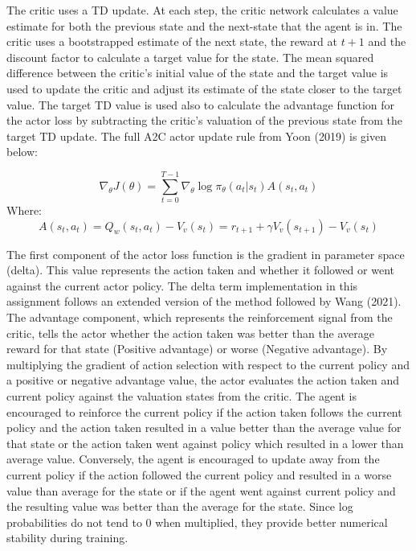 \documentclass{article}
\begin{document}
The critic uses a TD update. At each step, the critic network calculates a value estimate for both the previous state and the next-state that the agent is in. The critic uses a bootstrapped estimate of the next state, the reward at $t+1$ and the discount factor to calculate a target value for the state. The mean squared difference between the critic's initial value of the state and the target value is used to update the critic and adjust its estimate of the state closer to the target value. The target TD value is used also to calculate the advantage function for the actor loss by subtracting the critic's valuation of the previous state from the target TD update. The full A2C actor update rule from Yoon (2019) is given below:

\begin{equation}
\nabla_{\theta} J(\theta) = \sum_{t=0}^{T-1}\nabla_{\theta}\log{\pi_{\theta}}(a_{t} | s_{t}) A(s_{t}, a_{t})
\end{equation}
Where:
\begin{equation}
A(s_{t}, a_{t}) = Q_{w}(s_{t}, a_{t}) - V_{v}(s_{t}) = r_{t+1} + \gamma V_{v}(s_{t+1}) - V_{v}(s_{t})
\end{equation}

The first component of the actor loss function is the gradient in parameter space (delta). This value represents the action taken and whether it followed or went against the current actor policy. The delta term implementation in this assignment follows an extended version of the method followed by Wang (2021). The advantage component, which represents the reinforcement signal from the critic, tells the actor whether the action taken was better than the average reward for that state (Positive advantage) or worse (Negative advantage). By multiplying the gradient of action selection with respect to the current policy and a positive or negative advantage value, the actor evaluates the action taken and current policy against the valuation states from the critic. The agent is encouraged to reinforce the current policy if the action taken follows the current policy and the action taken resulted in a value better than the average value for that state or the action taken went against policy which resulted in a lower than average value. Conversely, the agent is encouraged to update away from the current policy if the action followed the current policy and resulted in a worse value than average for the state or if the agent went against current policy and the resulting value was better than the average for the state. Since log probabilities do not tend to 0 when multiplied, they provide better numerical stability during training.
\end{document}
